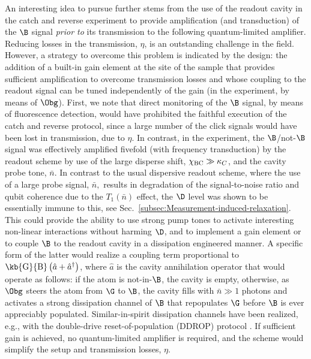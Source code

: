An interesting idea to pursue further stems from the use of the readout
cavity in the catch and reverse experiment to provide amplification
(and transduction) of the $\B$ signal \emph{prior to} its transmission
to the following quantum-limited amplifier. Reducing losses in the
transmission, $\eta$, is an outstanding challenge in the field. However,
a strategy to overcome this problem is indicated by the design: the
addition of a built-in gain element at the site of the sample that
provides sufficient amplification to overcome transmission losses
and whose coupling to the readout signal can be tuned independently
of the gain (in the experiment, by means of $\Obg$). First, we note
that direct monitoring of the $\B$ signal, by means of fluorescence
detection, would have prohibited the faithful execution of the catch
and reverse protocol, since a large number of the click signals would
have been lost in transmission, due to $\eta$. In contrast, in the
experiment, the $\B$/not-$\B$ signal was effectively amplified fivefold
(with frequency transduction) by the readout scheme by use of the
large disperse shift, $\chi_{{\rm BC}}\gg\kappa_{C}$, and the cavity
probe tone, $\bar{n}$. In contrast to the usual dispersive readout
scheme, where the use of a large probe signal, $\bar{n},$ results
in degradation of the signal-to-noise ratio and qubit coherence due
to the $T_{1}\left(\bar{n}\right)$ effect, the $\D$ level was shown
to be essentially immune to this, see Sec.~\ref{subsec:Measurement-induced-relaxation}.
This could provide the ability to use strong pump tones to activate
interesting non-linear interactions \citep{Mundhada2017,Mundhada2018}
without harming $\D$, and to implement a gain element or to couple
$\B$ to the readout cavity in a dissipation engineered manner. A
specific form of the latter would realize a coupling term proportional
to $\kb{\rm G}{\rm B}\left(\hat{a}+\hat{a}^{\dagger}\right)$, where
$\hat{a}$ is the cavity annihilation operator that would operate
as follows: if the atom is not-in-$\B$, the cavity is empty, otherwise,
as $\Obg$ steers the atom from $\G$ to $\B$, the cavity fills with
$\bar{n}\gg1$ photons and activates a strong dissipation channel
of $\B$ that repopulates $\G$ before $\B$ is ever appreciably populated.
Similar-in-spirit dissipation channels have been realized, e.g., with
the double-drive reset-of-population (DDROP) protocol \citep{Geerlings2013-reset}.
If sufficient gain is achieved, no quantum-limited amplifier is required,
and the scheme would simplify the setup and  transmission losses,
$\eta$. 


